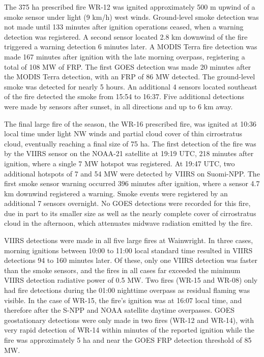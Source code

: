 \documentclass[fire,article,submit,moreauthors]{mdpi}
\begin{document}
The 375 ha prescribed fire WR-12 was ignited approximately 500 m upwind
of a smoke sensor under light (9 km/h) west winds. Ground-level smoke
detection was not made until 133 minutes after ignition operations
ceased, when a warning detection was registered. A second sensor located
2.8 km downwind of the fire triggered a warning detection 6 minutes
later. A MODIS Terra fire detection was made 167 minutes after ignition
with the late morning overpass, registering a total of 108 MW of FRP.
The first GOES detection was made 20 minutes after the MODIS Terra
detection, with an FRP of 86 MW detected. The ground-level smoke was
detected for nearly 5 hours. An additional 4 sensors located southeast
of the fire detected the smoke from 15:54 to 16:37. Five additional
detections were made by sensors after sunset, in all directions and up
to 6 km away.

The final large fire of the season, the WR-16 prescribed fire, was
ignited at 10:36 local time under light NW winds and partial cloud cover
of thin cirrostratus cloud, eventually reaching a final size of 75 ha.
The first detection of the fire was by the VIIRS sensor on the NOAA-21
satellite at 19:19 UTC, 218 minutes after ignition, where a single 7 MW
hotspot was registered. At 19:47 UTC, two additional hotspots of 7 and
54 MW were detected by VIIRS on Suomi-NPP. The first smoke sensor
warning occurred 396 minutes after ignition, where a sensor 4.7 km
downwind registered a warning. Smoke events were registered by an
additional 7 sensors overnight. No GOES detections were recorded for
this fire, due in part to its smaller size as well as the nearly
complete cover of cirrostratus cloud in the afternoon, which attenuates
midwave radiation emitted by the fire.

VIIRS detections were made in all five large fires at Wainwright. In
three cases, morning ignitions between 10:00 to 11:00 local standard
time resulted in VIIRS detections 94 to 160 minutes later. Of these,
only one VIIRS detection was faster than the smoke sensors, and the
fires in all cases far exceeded the minimum VIIRS detection radiative
power of 0.5 MW. Two fires (WR-15 and WR-08) only had fire detections
during the 01:00 nighttime overpass as residual flaming was visible. In
the case of WR-15, the fire's ignition was at 16:07 local time, and
therefore after the S-NPP and NOAA satellite daytime overpasses. GOES
geostationary detections were only made in two fires (WR-12 and WR-14),
with very rapid detection of WR-14 within minutes of the reported
ignition while the fire was approximately 5 ha and near the GOES FRP
detection threshold of 85 MW.
\end{document}
